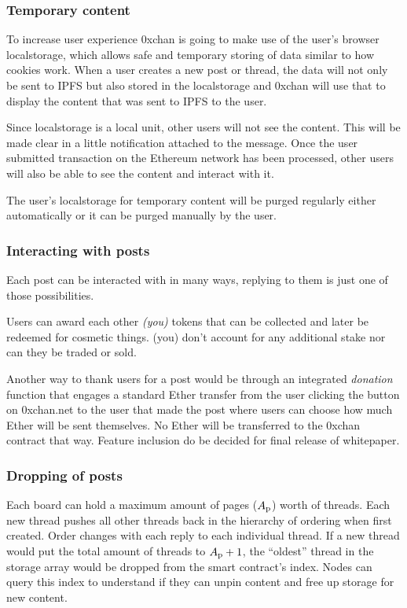 \documentclass[a4paper]{article}
\newcommand{\projectname}{0xchan}
\begin{document}
\subsubsection{Temporary content}
To increase user experience \projectname{} is going to make use of the user's browser localstorage, which allows safe and temporary storing of data similar to how cookies work. When a user creates a new post or thread, the data will not only be sent to IPFS but also stored in the localstorage and \projectname{} will use that to display the content that was sent to IPFS to the user.

Since localstorage is a local unit, other users will not see the content. This will be made clear in a little notification attached to the message. Once the user submitted transaction on the Ethereum network has been processed, other users will also be able to see the content and interact with it. 

The user's localstorage for temporary content will be purged regularly either automatically or it can be purged manually by the user.

\subsubsection{Interacting with posts}
Each post can be interacted with in many ways, replying to them is just one of those possibilities.

Users can award each other \emph{(you)} tokens that can be collected and later be redeemed for cosmetic things. (you) don't account for any additional stake nor can they be traded or sold.

Another way to thank users for a post would be through an integrated \emph{donation} function that engages a standard Ether transfer from the user clicking the button on 0xchan.net to the user that made the post where users can choose how much Ether will be sent themselves. No Ether will be transferred to the \projectname{} contract that way. Feature inclusion do be decided for final release of whitepaper.

\subsubsection{Dropping of posts}
Each board can hold a maximum amount of pages ($A\textsubscript{p}$) worth of threads. Each new thread pushes all other threads back in the hierarchy of ordering when first created. Order changes with each reply to each individual thread. If a new thread would put the total amount of threads to $A\textsubscript{p}+1$, the ``oldest'' thread in the storage array would be dropped from the smart contract's index. Nodes can query this index to understand if they can unpin content and free up storage for new content.
\end{document}
